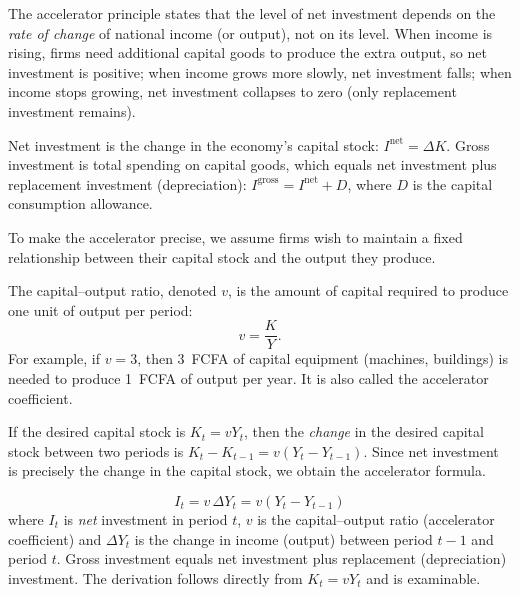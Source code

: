 \documentclass[11pt]{article}
\newcommand{\cle}[1]{{\popxbold\color{popdark}#1}}
\begin{document}
\begin{definition}
The \cle{accelerator principle} states that the level of \cle{net investment} depends on the \emph{rate of change} of national income (or output), not on its level. When income is rising, firms need additional capital goods to produce the extra output, so net investment is positive; when income grows more slowly, net investment falls; when income stops growing, net investment collapses to zero (only replacement investment remains).
\end{definition}

\begin{definition}
\cle{Net investment} is the change in the economy's capital stock: $I^{\text{net}} = \Delta K$. \cle{Gross investment} is total spending on capital goods, which equals net investment plus \cle{replacement investment} (depreciation): $I^{\text{gross}} = I^{\text{net}} + D$, where $D$ is the capital consumption allowance.
\end{definition}

To make the accelerator precise, we assume firms wish to maintain a fixed relationship between their capital stock and the output they produce.

\begin{definition}
The \cle{capital--output ratio}, denoted $v$, is the amount of capital required to produce one unit of output per period:
\[
v=\frac{K}{Y}.
\]
For example, if $v=3$, then \SI{3}{}~FCFA of capital equipment (machines, buildings) is needed to produce \SI{1}{}~FCFA of output per year. It is also called the \cle{accelerator coefficient}.
\end{definition}

If the desired capital stock is $K_t=vY_t$, then the \emph{change} in the desired capital stock between two periods is $K_t-K_{t-1}=v(Y_t-Y_{t-1})$. Since net investment is precisely the change in the capital stock, we obtain the accelerator formula.

\begin{propriete}
\[
\boxed{\,I_t=v\,\Delta Y_t=v\left(Y_t-Y_{t-1}\right)\,}
\]
where $I_t$ is \emph{net} investment in period $t$, $v$ is the capital--output ratio (accelerator coefficient) and $\Delta Y_t$ is the change in income (output) between period $t-1$ and period $t$. Gross investment equals net investment plus replacement (depreciation) investment. The derivation follows directly from $K_t=vY_t$ and is examinable.
\end{propriete}
\end{document}
